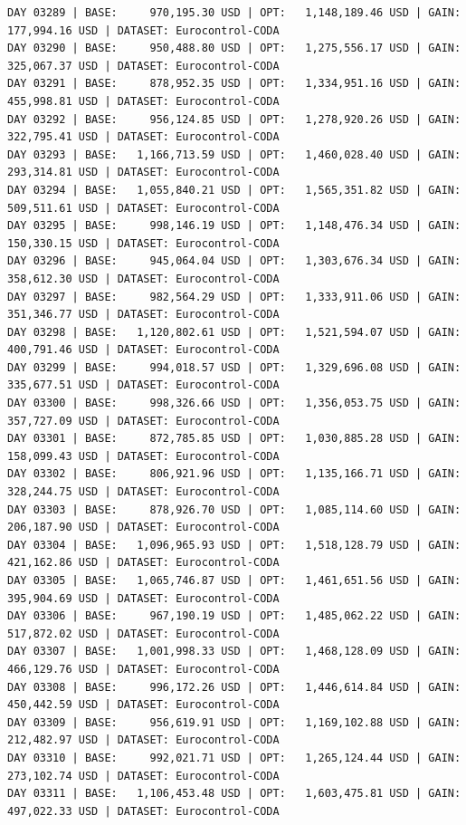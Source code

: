 \documentclass[11pt,a4paper]{article}
\begin{document}
\begin{verbatim}
DAY 03289 | BASE:     970,195.30 USD | OPT:   1,148,189.46 USD | GAIN: 177,994.16 USD | DATASET: Eurocontrol-CODA
DAY 03290 | BASE:     950,488.80 USD | OPT:   1,275,556.17 USD | GAIN: 325,067.37 USD | DATASET: Eurocontrol-CODA
DAY 03291 | BASE:     878,952.35 USD | OPT:   1,334,951.16 USD | GAIN: 455,998.81 USD | DATASET: Eurocontrol-CODA
DAY 03292 | BASE:     956,124.85 USD | OPT:   1,278,920.26 USD | GAIN: 322,795.41 USD | DATASET: Eurocontrol-CODA
DAY 03293 | BASE:   1,166,713.59 USD | OPT:   1,460,028.40 USD | GAIN: 293,314.81 USD | DATASET: Eurocontrol-CODA
DAY 03294 | BASE:   1,055,840.21 USD | OPT:   1,565,351.82 USD | GAIN: 509,511.61 USD | DATASET: Eurocontrol-CODA
DAY 03295 | BASE:     998,146.19 USD | OPT:   1,148,476.34 USD | GAIN: 150,330.15 USD | DATASET: Eurocontrol-CODA
DAY 03296 | BASE:     945,064.04 USD | OPT:   1,303,676.34 USD | GAIN: 358,612.30 USD | DATASET: Eurocontrol-CODA
DAY 03297 | BASE:     982,564.29 USD | OPT:   1,333,911.06 USD | GAIN: 351,346.77 USD | DATASET: Eurocontrol-CODA
DAY 03298 | BASE:   1,120,802.61 USD | OPT:   1,521,594.07 USD | GAIN: 400,791.46 USD | DATASET: Eurocontrol-CODA
DAY 03299 | BASE:     994,018.57 USD | OPT:   1,329,696.08 USD | GAIN: 335,677.51 USD | DATASET: Eurocontrol-CODA
DAY 03300 | BASE:     998,326.66 USD | OPT:   1,356,053.75 USD | GAIN: 357,727.09 USD | DATASET: Eurocontrol-CODA
DAY 03301 | BASE:     872,785.85 USD | OPT:   1,030,885.28 USD | GAIN: 158,099.43 USD | DATASET: Eurocontrol-CODA
DAY 03302 | BASE:     806,921.96 USD | OPT:   1,135,166.71 USD | GAIN: 328,244.75 USD | DATASET: Eurocontrol-CODA
DAY 03303 | BASE:     878,926.70 USD | OPT:   1,085,114.60 USD | GAIN: 206,187.90 USD | DATASET: Eurocontrol-CODA
DAY 03304 | BASE:   1,096,965.93 USD | OPT:   1,518,128.79 USD | GAIN: 421,162.86 USD | DATASET: Eurocontrol-CODA
DAY 03305 | BASE:   1,065,746.87 USD | OPT:   1,461,651.56 USD | GAIN: 395,904.69 USD | DATASET: Eurocontrol-CODA
DAY 03306 | BASE:     967,190.19 USD | OPT:   1,485,062.22 USD | GAIN: 517,872.02 USD | DATASET: Eurocontrol-CODA
DAY 03307 | BASE:   1,001,998.33 USD | OPT:   1,468,128.09 USD | GAIN: 466,129.76 USD | DATASET: Eurocontrol-CODA
DAY 03308 | BASE:     996,172.26 USD | OPT:   1,446,614.84 USD | GAIN: 450,442.59 USD | DATASET: Eurocontrol-CODA
DAY 03309 | BASE:     956,619.91 USD | OPT:   1,169,102.88 USD | GAIN: 212,482.97 USD | DATASET: Eurocontrol-CODA
DAY 03310 | BASE:     992,021.71 USD | OPT:   1,265,124.44 USD | GAIN: 273,102.74 USD | DATASET: Eurocontrol-CODA
DAY 03311 | BASE:   1,106,453.48 USD | OPT:   1,603,475.81 USD | GAIN: 497,022.33 USD | DATASET: Eurocontrol-CODA

\end{verbatim}
\end{document}
